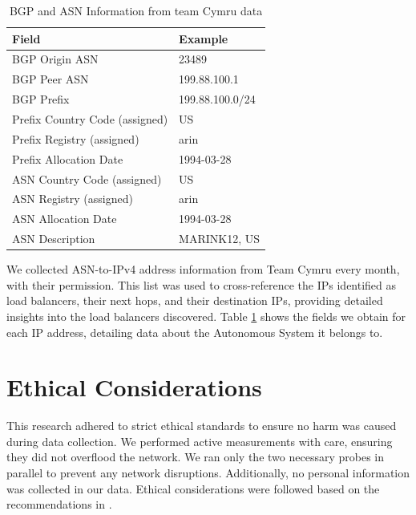 \documentclass[12pt]{cwru_thesis}
\begin{document}
\begin{table}[h]
    \centering
    \begin{tabularx}{0.6\textwidth}{|l|X|}
        \hline
        \textbf{Field} & \textbf{Example} \\
        \hline
        BGP Origin ASN & 23489 \\
        \hline
        BGP Peer ASN & 199.88.100.1 \\
        \hline
        BGP Prefix & 199.88.100.0/24 \\
        \hline
        Prefix Country Code (assigned) & US \\
        \hline
        Prefix Registry (assigned) & arin \\
        \hline
        Prefix Allocation Date & 1994-03-28 \\
        \hline
        ASN Country Code (assigned) & US \\
        \hline
        ASN Registry (assigned) & arin \\
        \hline
        ASN Allocation Date & 1994-03-28 \\
        \hline
        ASN Description & MARINK12, US \\
        \hline
    \end{tabularx}
    \caption{BGP and ASN Information from team Cymru data}
    \label{tab:bgp_asn_info}
\end{table}
 
 We collected ASN-to-IPv4 address information from Team Cymru every month, with their permission. This list was used to cross-reference the IPs identified as load balancers, their next hops, and their destination IPs, providing detailed insights into the load balancers discovered. Table \ref{tab:bgp_asn_info} shows the fields we obtain for each IP address, detailing data about  the Autonomous System it belongs to. 



\section{Ethical Considerations}

This research adhered to strict ethical standards to ensure no harm was caused during data collection. We performed active measurements with care, ensuring they did not overflood the network. We ran only the two necessary probes in parallel to prevent any network disruptions. Additionally, no personal information was collected in our data. Ethical considerations were followed based on the recommendations in  \cite{partridge2016ethical}.
\end{document}
